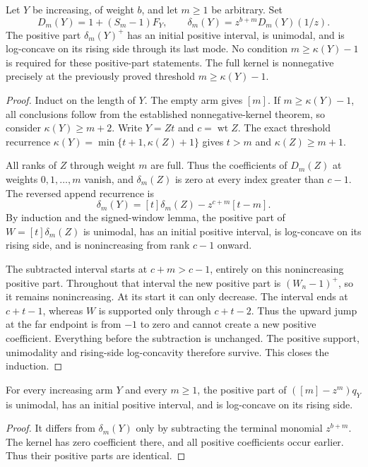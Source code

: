 \begin{theorem}
Let $Y$ be increasing, of weight $b$, and let $m\ge1$ be arbitrary.
Set
\[
 D_m(Y)=1+(S_m-1)F_Y,\qquad
 \delta_m(Y)=z^{b+m}D_m(Y)(1/z).
\]
The positive part $\delta_m(Y)^+$ has an initial positive interval,
is unimodal, and is log-concave on its rising side through its last
mode. No condition $m\ge\kappa(Y)-1$ is required for these positive-part
statements. The full kernel is nonnegative precisely at the previously
proved threshold $m\ge\kappa(Y)-1$.
\end{theorem}
\begin{proof}
Induct on the length of $Y$. The empty arm gives $[m]$.
If $m\ge\kappa(Y)-1$, all conclusions follow from the established
nonnegative-kernel theorem, so consider $\kappa(Y)\ge m+2$.
Write $Y=Zt$ and $c=\operatorname{wt}Z$.
The exact threshold recurrence
$\kappa(Y)=\min\{t+1,\kappa(Z)+1\}$ gives
$t>m$ and $\kappa(Z)\ge m+1$.

All ranks of $Z$ through weight $m$ are full. Thus the coefficients
of $D_m(Z)$ at weights $0,1,\ldots,m$ vanish, and
$\delta_m(Z)$ is zero at every index greater than $c-1$.
The reversed append recurrence is
\[
 \delta_m(Y)=[t]\delta_m(Z)-z^{c+m}[t-m].
\]
By induction and the signed-window lemma, the positive part of
$W=[t]\delta_m(Z)$ is unimodal, has an initial positive interval,
is log-concave on its rising side, and is nonincreasing from
rank $c-1$ onward.

The subtracted interval starts at $c+m>c-1$, entirely on this
nonincreasing positive part. Throughout that interval the new
positive part is $(W_n-1)^+$, so it remains nonincreasing.
At its start it can only decrease. The interval ends at $c+t-1$,
whereas $W$ is supported only through $c+t-2$. Thus the upward
jump at the far endpoint is from $-1$ to zero and cannot create a
new positive coefficient. Everything before the subtraction is
unchanged. The positive support, unimodality and rising-side
log-concavity therefore survive. This closes the induction.
\end{proof}

\begin{corollary}
For every increasing arm $Y$ and every $m\ge1$, the positive part
of $([m]-z^m)q_Y$ is unimodal, has an initial positive interval,
and is log-concave on its rising side.
\end{corollary}
\begin{proof}
It differs from $\delta_m(Y)$ only by subtracting the terminal
monomial $z^{b+m}$. The kernel has zero coefficient there, and
all positive coefficients occur earlier. Thus their positive parts
are identical.
\end{proof}

